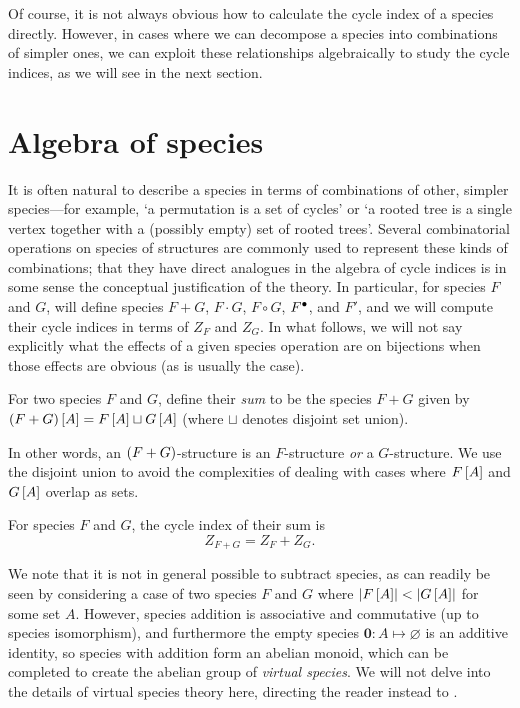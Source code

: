 \documentclass[sectionflow,singlespace,twoside,boldmathhdr]{brandiss} %
\numberwithin{section}{chapter}
\numberwithin{figure}{chapter}
\begin{document}
Of course, it is not always obvious how to calculate the cycle index of a species directly.
However, in cases where we can decompose a species into combinations of simpler ones, we can exploit these relationships algebraically to study the cycle indices, as we will see in the next section.

\section{Algebra of species}\label{s:specalg}
It is often natural to describe a species in terms of combinations of other, simpler species---for example, `a permutation is a set of cycles' or `a rooted tree is a single vertex together with a (possibly empty) set of rooted trees'.
Several combinatorial operations on species of structures are commonly used to represent these kinds of combinations; that they have direct analogues in the algebra of cycle indices is in some sense the conceptual justification of the theory.
In particular, for species $F$ and $G$, will define species $F + G$, $F \cdot G$, $F \circ G$, ${F}^{\bullet }$, and $F'$, and we will compute their cycle indices in terms of $Z_{F}$ and $Z_{G}$.
In what follows, we will not say explicitly what the effects of a given species operation are on bijections when those effects are obvious (as is usually the case).

\begin{definition}\label{def:specsum}
  For two species $F$ and $G$, define their \emph{sum} to be the species $F + G$ given by $\left( {F + G} \right) \left[ {A} \right] = F \left[ {A} \right] \sqcup G \left[ {A} \right]$ (where $\sqcup$ denotes disjoint set union).
\end{definition}
In other words, an $\left( {F + G} \right)$-structure is an $F$-structure \emph{or} a $G$-structure.
We use the disjoint union to avoid the complexities of dealing with cases where $F \left[ {A} \right]$ and $G \left[ {A} \right]$ overlap as sets.

\begin{theorem}\label{thm:specsumci}
  For species $F$ and $G$, the cycle index of their sum is
  \begin{equation}
    \label{eq:specsumci}
    Z_{F + G} = Z_{F} + Z_{G}.
  \end{equation}
\end{theorem}

We note that it is not in general possible to subtract species, as can readily be seen by considering a case of two species $F$ and $G$ where $\left\vert {F \ensuremath{\left[ {A} \right]}} \right\vert < \left\vert {G \ensuremath{\left[ {A} \right]}} \right\vert$ for some set $A$.
However, species addition is associative and commutative (up to species isomorphism), and furthermore the empty species $\mathbf{0}: A \mapsto \varnothing$ is an additive identity, so species with addition form an abelian monoid, which can be completed to create the abelian group of \emph{virtual species}.
We will not delve into the details of virtual species theory here, directing the reader instead to \cite[\S 2.5]{bll:species}.
\end{document}
